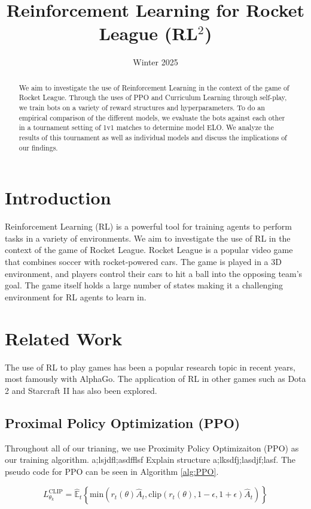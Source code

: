 \documentclass[conference]{IEEEtran}
\title{Reinforcement Learning for Rocket League (RL$^2$)}
\author{
    \IEEEauthorblockN{Anshuman Dash, Phillip Peng, Matthew Shen}
    \IEEEauthorblockA{
        Department of Computer Science\\
        University of California, Santa Barbara\\
        Email: \{anshumandash, plp, matthewshen\}@ucsb.edu
    }
}
\date{Winter 2025}
\begin{document}
\maketitle

\begin{abstract}
We aim to investigate the use of Reinforcement Learning in the context of the game of Rocket League. Through the uses of PPO and Curriculum Learning through self-play, we train bots on a variety of reward structures and hyperparameters. To do an empirical comparison of the different models, we evaluate the bots against each other in a tournament setting of 1v1 matches to determine model ELO. We analyze the results of this tournament as well as individual models and discuss the implications of our findings.
\end{abstract}

\section{Introduction}
Reinforcement Learning (RL) is a powerful tool for training agents to perform tasks in a variety of environments. We aim to investigate the use of RL in the context of the game of Rocket League. Rocket League is a popular video game that combines soccer with rocket-powered cars. The game is played in a 3D environment, and players control their cars to hit a ball into the opposing team's goal. The game itself holds a large number of states making it a challenging environment for RL agents to learn in. 

\section{Related Work}
The use of RL to play games has been a popular research topic in recent years, most famously with AlphaGo. The application of RL in other games such as Dota 2 and Starcraft II has also been explored. 


\subsection{Proximal Policy Optimization (PPO)}
Throughout all of our trianing, we use Proximity Policy Optimizaiton (PPO) as our training algorithm. a;lsjdfl;asdfflsf Explain structure a;lksdfj;lasdjf;lasf. The pseudo code for PPO can be seen in Algorithm \ref{alg:PPO}.

\[
    L_{\theta_k}^{\text{CLIP}} = \hat{\mathbb{E}}_t\left\{ \text{min}(r_t(\theta)\hat{A}_t, \text{clip}(r_t(\theta), 1-\epsilon, 1+\epsilon)\hat{A}_t)\right\}
\]
\end{document}
